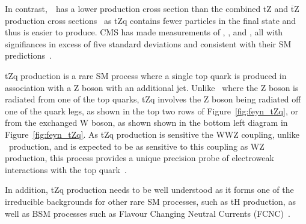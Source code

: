 
In contrast,~\ttZ~has a lower production cross section than the combined tZ and $\overline{\text{t}}$Z production cross sections~\cite{Campbell:2013yla} as tZq contains fewer particles in the final state and thus is easier to produce.
CMS has made measurements of \ttH, \ttW, and \ttZ, all with signifiances in excess of five standard deviations and consistent with their SM predictions~\cite{Sirunyan:2017uzs,Sirunyan:2018hoz}.

tZq production is a rare SM process where a single top quark is produced in association with a Z boson with an additional jet.
Unlike \ttZ~where the Z boson is radiated from one of the top quarks, tZq involves the Z boson being radiated off one of the quark legs, as shown in the top two rows of Figure~\ref{fig:feyn_tZq}, or from the exchanged W boson, as shown shown in the bottom left diagram in Figure~\ref{fig:feyn_tZq}.
As tZq production is sensitive the WWZ coupling, unlike \ttZ~production, and is expected to be as sensitive to this coupling as WZ production, this process provides a unique precision probe of electroweak interactions with the top quark~\cite{Campbell:2013yla}.

In addition, tZq production needs to be well understood as it forms one of the irreducible backgrounds for other rare SM processes, such as tH production, as well as BSM processes such as Flavour Changing Neutral Currents (FCNC)~\cite{AguilarSaavedra:2004wm}.

